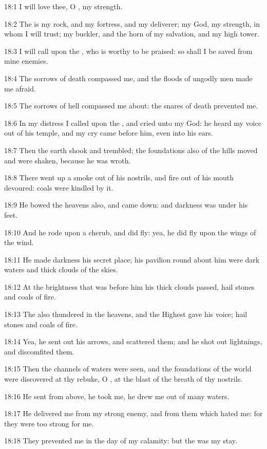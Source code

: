 18:1 I will love thee, O \LORD, my strength.

18:2 The \LORD is my rock, and my fortress, and my deliverer; my God,
my strength, in whom I will trust; my buckler, and the horn of my
salvation, and my high tower.

18:3 I will call upon the \LORD, who is worthy to be praised: so shall
I be saved from mine enemies.

18:4 The sorrows of death compassed me, and the floods of ungodly men
made me afraid.

18:5 The sorrows of hell compassed me about: the snares of death
prevented me.

18:6 In my distress I called upon the \LORD, and cried unto my God: he
heard my voice out of his temple, and my cry came before him, even
into his ears.

18:7 Then the earth shook and trembled; the foundations also of the
hills moved and were shaken, because he was wroth.

18:8 There went up a smoke out of his nostrils, and fire out of his
mouth devoured: coals were kindled by it.

18:9 He bowed the heavens also, and came down: and darkness was under
his feet.

18:10 And he rode upon a cherub, and did fly: yea, he did fly upon the
wings of the wind.

18:11 He made darkness his secret place; his pavilion round about him
were dark waters and thick clouds of the skies.

18:12 At the brightness that was before him his thick clouds passed,
hail stones and coals of fire.

18:13 The \LORD also thundered in the heavens, and the Highest gave his
voice; hail stones and coals of fire.

18:14 Yea, he sent out his arrows, and scattered them; and he shot out
lightnings, and discomfited them.

18:15 Then the channels of waters were seen, and the foundations of
the world were discovered at thy rebuke, O \LORD, at the blast of the
breath of thy nostrils.

18:16 He sent from above, he took me, he drew me out of many waters.

18:17 He delivered me from my strong enemy, and from them which hated
me: for they were too strong for me.

18:18 They prevented me in the day of my calamity: but the \LORD was my
stay.

